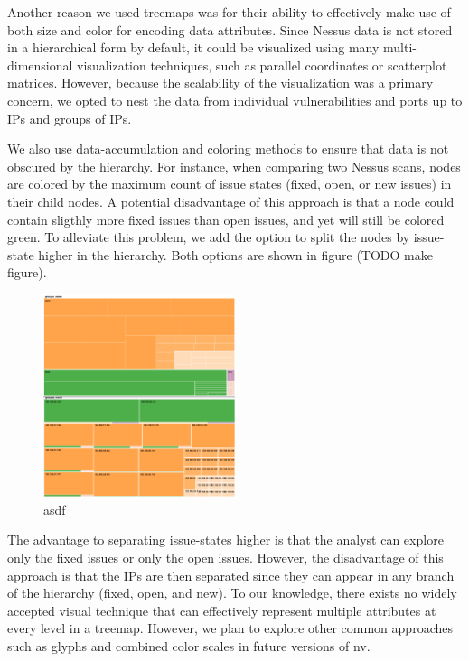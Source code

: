 \documentclass{acm_proc_article-sp}
\begin{document}
Another reason we used treemaps was for their ability to effectively make use of both size and color for encoding data attributes.
Since Nessus data is not stored in a hierarchical form by default, it could be visualized using many multi-dimensional visualization techniques, such as parallel coordinates or scatterplot matrices.
However, because the scalability of the visualization was a primary concern, we opted to nest the data from individual vulnerabilities and ports up to IPs and groups of IPs.

We also use data-accumulation and coloring methods to ensure that data is not obscured by the hierarchy.
For instance, when comparing two Nessus scans, nodes are colored by the maximum count of issue states (fixed, open, or new issues) in their child nodes.
A potential disadvantage of this approach is that a node could contain sligthly more fixed issues than open issues, and yet will still be colored green.
To alleviate this problem, we add the option to split the nodes by issue-state higher in the hierarchy.
Both options are shown in figure (TODO make figure).



\begin{figure}
  \label{StateIssueFig}
  \centering
  \includegraphics[width=0.5\textwidth]{../screenshots/state_issue}
  \caption{asdf}
\end{figure}

The advantage to separating issue-states higher is that the analyst can explore only the fixed issues or only the open issues.
However, the disadvantage of this approach is that the IPs are then separated since they can appear in any branch of the hierarchy (fixed, open, and new).
To our knowledge, there exists no widely accepted visual technique that can effectively represent multiple attributes at every level in a treemap.
However, we plan to explore other common approaches such as glyphs and combined color scales in future versions of nv.
\end{document}
